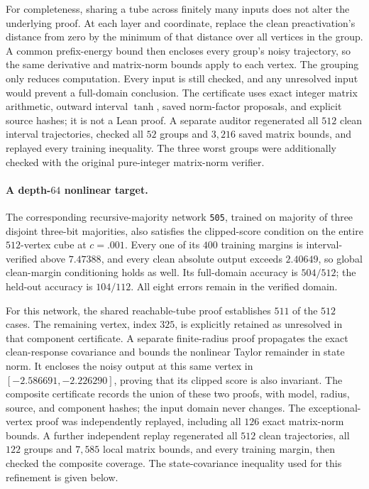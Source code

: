 For completeness, sharing a tube across finitely many inputs does not alter the underlying proof.  At each layer and coordinate, replace the clean preactivation's distance from zero by the minimum of that distance over all vertices in the group.  A common prefix-energy bound then encloses every group's noisy trajectory, so the same derivative and matrix-norm bounds apply to each vertex.  The grouping only reduces computation.  Every input is still checked, and any unresolved input would prevent a full-domain conclusion.  The certificate uses exact integer matrix arithmetic, outward interval $\tanh$, saved norm-factor proposals, and explicit source hashes; it is not a Lean proof.  A separate auditor regenerated all $512$ clean interval trajectories, checked all $52$ groups and $3{,}216$ saved matrix bounds, and replayed every training inequality.  The three worst groups were additionally checked with the original pure-integer matrix-norm verifier.

\paragraph{A depth-$64$ nonlinear target.}
The corresponding recursive-majority network \texttt{505}, trained on majority of three disjoint three-bit majorities, also satisfies the clipped-score condition on the entire $512$-vertex cube at $c=.001$.  Every one of its $400$ training margins is interval-verified above $7.47388$, and every clean absolute output exceeds $2.40649$, so global clean-margin conditioning holds as well.  Its full-domain accuracy is $504/512$; the held-out accuracy is $104/112$.  All eight errors remain in the verified domain.

For this network, the shared reachable-tube proof establishes $511$ of the $512$ cases.  The remaining vertex, index $325$, is explicitly retained as unresolved in that component certificate.  A separate finite-radius proof propagates the exact clean-response covariance and bounds the nonlinear Taylor remainder in state norm.  It encloses the noisy output at this same vertex in $[-2.586691,-2.226290]$, proving that its clipped score is also invariant.  The composite certificate records the union of these two proofs, with model, radius, source, and component hashes; the input domain never changes.  The exceptional-vertex proof was independently replayed, including all $126$ exact matrix-norm bounds.  A further independent replay regenerated all $512$ clean trajectories, all $122$ groups and $7{,}585$ local matrix bounds, and every training margin, then checked the composite coverage.  The state-covariance inequality used for this refinement is given below.
